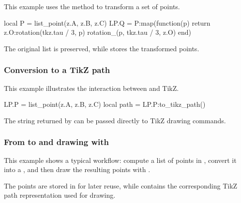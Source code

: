 This example uses the  method to transform a set of points.

\begin{tkzexample}
local P = list_point(z.A, z.B, z.C)
LP.Q = P:map(function(p)
  return z.O:rotation(tkz.tau / 3, p) rotation_(p, tkz.tau / 3, z.O)
end)
\end{tkzexample}

The original list  is preserved, while  stores the transformed points.

\subsubsection{Conversion to a TikZ path}
\label{ssub:list_point_example_path}

This example illustrates the interaction between  and TikZ.

\begin{tkzexample}
LP.P = list_point(z.A, z.B, z.C)
local path = LP.P:to_tikz_path()
\end{tkzexample}

The string returned by  can be passed directly
to TikZ drawing commands.


\subsubsection{From  to  and drawing with }
\label{ssub:list_point_example_points_path_draw}

This example shows a typical workflow: compute a list of points in ,
convert it into a , and then draw the resulting points with
.


\begin{tkzexample}[latex = .5\textwidth]
\begin{center}
\end{center}
\end{tkzexample}

The points are stored in  for later reuse, while 
contains the corresponding TikZ path representation used for drawing.
